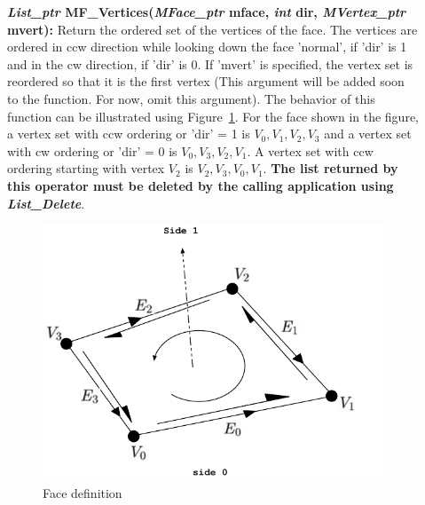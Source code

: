 \documentclass[12pt]{article}
\begin{document}
\begin{description}
\item[]{\bf {\em List\_ptr} MF\_Vertices({\em MFace\_ptr}
    mface, {\em int} dir, {\em MVertex\_ptr} mvert):} Return the
  ordered set of the vertices of the face. The vertices are ordered in
  ccw direction while looking down the face 'normal', if 'dir' is 1
  and in the cw direction, if 'dir' is 0. If 'mvert' is specified, the
  vertex set is reordered so that it is the first vertex (This
  argument will be added soon to the function. For now, omit this
  argument). The behavior of this function can be illustrated using
  Figure~\ref{fig:face_def}. For the face shown in the figure, a
  vertex set with ccw ordering or 'dir' = 1 is ${V_0,V_1,V_2,V_3}$ and
  a vertex set with cw ordering or 'dir' = 0 is ${V_0,V_3,V_2,V_1}$.
  A vertex set with ccw ordering starting with vertex $V_2$ is
  ${V_2,V_3,V_0,V_1}$.  {\bf The list returned by this
  operator must be deleted by the calling application using {\em List\_Delete}}.

\begin{figure}[!h]
  \begin{center}
  \includegraphics[scale=1.0]{figures/face_def} 
  \caption{Face definition}
  \label{fig:face_def}
  \end{center}
\end{figure}



\end{description}
\end{document}
